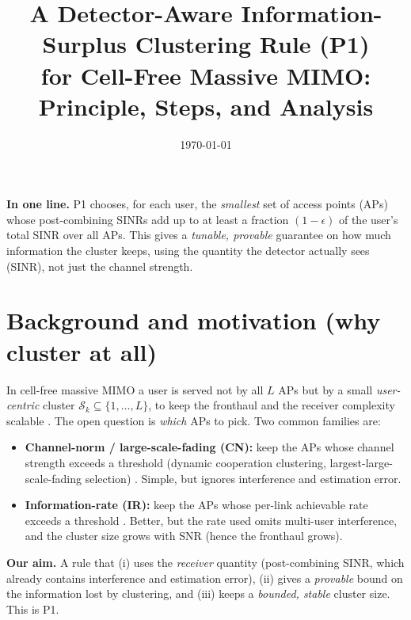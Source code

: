 \documentclass[11pt]{article}
\title{\textbf{A Detector-Aware Information-Surplus Clustering Rule (P1)\\for Cell-Free Massive MIMO: Principle, Steps, and Analysis}}
\date{\today}
\newcommand{\Sk}{\mathcal{S}_k}\newcommand{\E}{\mathbb{E}}
\begin{document}
\maketitle
\newcommand{\vexp}[2]{\par\smallskip\noindent where #1}

\begin{keybox}
\textbf{In one line.} P1 chooses, for each user, the \emph{smallest} set of access points (APs)
whose post-combining SINRs add up to at least a fraction $(1-\epsilon)$ of the user's total SINR
over all APs. This gives a \emph{tunable, provable} guarantee on how much information the cluster
keeps, using the quantity the detector actually sees (SINR), not just the channel strength.
\end{keybox}

\section{Background and motivation (why cluster at all)}
In cell-free massive MIMO a user is served not by all $L$ APs but by a small \emph{user-centric}
cluster $\Sk\subseteq\{1,\dots,L\}$, to keep the fronthaul and the receiver complexity scalable
\cite{ngo2017cellfree,buzzi2017usercentric,interdonato2019ubiquitous,bjornson2020scalable}. The open
question is \emph{which} APs to pick. Two common families are:
\begin{itemize}[leftmargin=1.4em,itemsep=1pt]
\item \textbf{Channel-norm / large-scale-fading (CN):} keep the APs whose channel strength exceeds a
      threshold (dynamic cooperation clustering, largest-large-scale-fading selection)
      \cite{bjornson2020scalable,ngo2018totalenergy}. Simple, but ignores interference and
      estimation error.
\item \textbf{Information-rate (IR):} keep the APs whose per-link achievable rate exceeds a threshold
      \cite{mashdour2024clustering}. Better, but the rate used omits multi-user interference, and the
      cluster size grows with SNR (hence the fronthaul grows).
\end{itemize}
\textbf{Our aim.} A rule that (i) uses the \emph{receiver} quantity (post-combining SINR, which
already contains interference and estimation error), (ii) gives a \emph{provable} bound on the
information lost by clustering, and (iii) keeps a \emph{bounded, stable} cluster size. This is P1.
\end{document}
